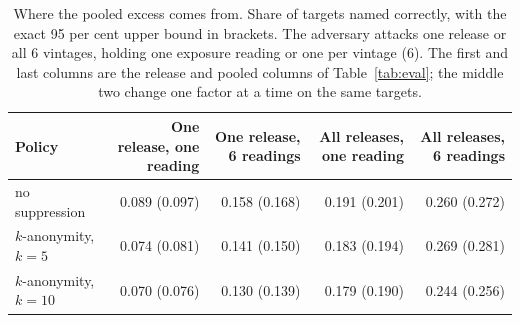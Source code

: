 \begin{table}[t]
\centering
\caption{Where the pooled excess comes from. Share of targets named correctly, with the exact 95 per cent upper bound in brackets. The adversary attacks one release or all 6 vintages, holding one exposure reading or one per vintage (6). The first and last columns are the release and pooled columns of Table~\ref{tab:eval}; the middle two change one factor at a time on the same targets.}
\label{tab:decomp}
\small
\begin{tabular}{lrrrr}
\toprule
Policy & One release, one reading & One release, 6 readings & All releases, one reading & All releases, 6 readings \\
\midrule
no suppression & 0.089 (0.097) & 0.158 (0.168) & 0.191 (0.201) & 0.260 (0.272) \\
$k$-anonymity, $k=5$ & 0.074 (0.081) & 0.141 (0.150) & 0.183 (0.194) & 0.269 (0.281) \\
$k$-anonymity, $k=10$ & 0.070 (0.076) & 0.130 (0.139) & 0.179 (0.190) & 0.244 (0.256) \\
\bottomrule
\end{tabular}
\end{table}
